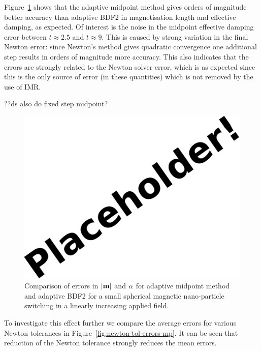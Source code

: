 Figure~\ref{fig:linear-field-switch-errors-mp} shows that the adaptive midpoint method gives orders of magnitude better accuracy than adaptive BDF2 in magnetisation length and effective damping, as expected.
Of interest is the noise in the midpoint effective damping error between $t \approx 2.5$ and $t \approx 9$.
This is caused by strong variation in the final Newton error: since Newton's method gives quadratic convergence one additional step results in orders of magnitude more accuracy.
This also indicates that the errors are strongly related to the Newton solver error, which is as expected since this is the only source of error (in these quantities) which is not removed by the use of IMR.

??ds also do fixed step midpoint?

\begin{figure}[ht!]
  \centering
  \includegraphics{images/placeholder}
  \caption{Comparison of errors in $\lvert \mathbf{m} \rvert$ and $\alpha$ for adaptive midpoint method and adaptive BDF2 for a small spherical magnetic nano-particle switching in a linearly increasing applied field.}
  \label{fig:linear-field-switch-errors-mp}
\end{figure}


To investigate this effect further we compare the average errors for various Newton tolerances in Figure~\ref{fig:newton-tol-errors-mp}.
It can be seen that reduction of the Newton tolerance strongly reduces the mean errors.

